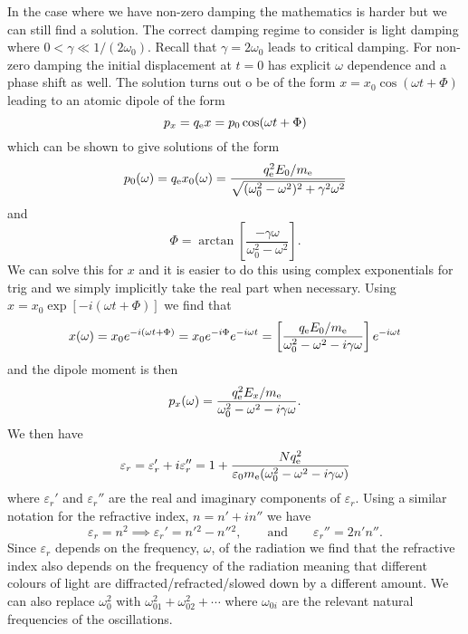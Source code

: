     In the case where we have non-zero damping the mathematics is harder but we can still find a solution.
    The correct damping regime to consider is light damping where \(0 < \gamma \ll 1/(2\omega_0)\).
    Recall that \(\gamma = 2\omega_0\) leads to critical damping.
    For non-zero damping the initial displacement at \(t = 0\) has explicit \(\omega\) dependence and a phase shift as well.
    The solution turns out o be of the form \(x = x_0\cos(\omega t + \Phi)\) leading to an atomic dipole of the form
    \[p_x = q_{\mathrm{e}} x = p_0\cos(\omega t + \Phi)\]
    which can be shown to give solutions of the form
    \[p_0(\omega) = q_{\mathrm{e}} x_0(\omega) = \frac{q_{\mathrm{e}}^2 E_0/m_{\mathrm{e}}}{\sqrt{(\omega_0^2 - \omega^2)^2 + \gamma^2\omega^2}}\]
    and
    \[\Phi = \arctan\left[ \frac{-\gamma\omega}{\omega_0^2 - \omega^2} \right].\] 
    We can solve this for \(x\) and it is easier to do this using complex exponentials for trig and we simply implicitly take the real part when necessary.
    Using \(x = x_0\exp[-i(\omega t + \Phi)]\) we find that
    \[x(\omega) = x_0e^{-i(\omega t + \Phi)} = x_0e^{-i\Phi}e^{-i\omega t} = \left[ \frac{q_{\mathrm{e}} E_0/m_{\mathrm{e}}}{\omega_0^2 - \omega^2 - i\gamma\omega} \right]e^{-i\omega t}\]
    and the dipole moment is then
    \[p_x(\omega) = \frac{q_{\mathrm{e}}^2 E_x/m_{\mathrm{e}}}{\omega_0^2 - \omega^2 - i\gamma \omega}.\]
    We then have
    \begin{equation}\label{eqn:epsilon r oscillator model}
        \varepsilon_r = \varepsilon_r' + i\varepsilon_r'' = 1 + \frac{Nq_{\mathrm{e}}^2}{\varepsilon_0m_{\mathrm{e}} (\omega_0^2 - \omega^2 - i\gamma\omega)}
    \end{equation}
    where \(\varepsilon_r'\) and \(\varepsilon_r''\) are the real and imaginary components of \(\varepsilon_r\).
    Using a similar notation for the refractive index, \(n = n' + in''\) we have
    \[\varepsilon_r = n^2 \implies \varepsilon_r' = n'{^2} - n''{^2}, \qquad\text{and}\qquad \varepsilon_r'' = 2n'n''.\]
    Since \(\varepsilon_r\) depends on the frequency, \(\omega\), of the radiation we find that the refractive index also depends on the frequency of the radiation meaning that different colours of light are diffracted/refracted/slowed down by a different amount.
    We can also replace \(\omega_0^2\) with \(\omega_{01}^2 + \omega_{02}^2 + \dotsb\) where \(\omega_{0i}\) are the relevant natural frequencies of the oscillations.
    
